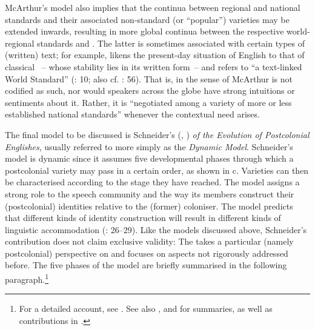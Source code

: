   McArthur’s model also implies that the continua between regional and national standards and their associated non-standard (or “popular”) varieties may be extended inwards, resulting in more global continua between the respective world-regional standards and . The latter is sometimes associated with certain types of (written) text; for example, \citet{McArthur1987} likens the present-day situation of English to that of classical ~– whose stability lies in its written form~– and refers to “a text-linked World Standard” (\citealt{McArthur1987}: 10; also cf. \citealt{McArthur2003}: 56). That is,  in the sense of McArthur is not codified as such, nor would speakers across the globe have strong intuitions or sentiments about it. Rather, it is “negotiated among a variety of more or less established national standards” \citep[10]{McArthur1987} whenever the contextual need arises.

  The final model to be discussed is Schneider’s (\citeyear{Schneider2003}, \citeyear[21–70]{Schneider2007}) \textit{ of the Evolution of Postcolonial Englishes}, usually referred to more simply as the \textit{Dynamic Model}. Schneider’s model is dynamic since it assumes five developmental phases through which a postcolonial variety may pass in a certain order, as shown in c. Varieties can then be characterised according to the stage they have reached. The model assigns a strong role to the speech community and the way its members construct their (postcolonial) identities relative to the (former) coloniser. The model predicts that different kinds of identity construction will result in different kinds of linguistic accommodation (\citealt{Schneider2007}: 26–29). Like the models discussed above, Schneider’s contribution does not claim exclusive validity: The  takes a particular (namely postcolonial) perspective on  and focuses on aspects not rigorously addressed before. The five phases of the model are briefly summarised in the following paragraph.\footnote{For a detailed account, see \citet[33–55]{Schneider2007}. See also \citet[32–33]{MesthrieBhatt2008}, \citet[11–12]{Schneider2014} and \citet{Werner2014} for summaries, as well as contributions in \citet{BuschfeldEtAl2014}.}

